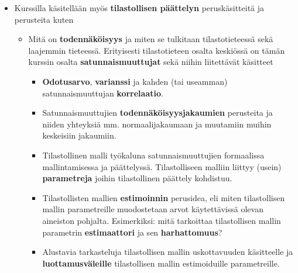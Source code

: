 \documentclass[
]{book}
\providecommand{\tightlist}{%
  \setlength{\itemsep}{0pt}\setlength{\parskip}{0pt}}
\begin{document}
\vspace{0.75cm}

\begin{itemize}
\tightlist
\item
  Kurssilla käsitellään myös \textbf{tilastollisen päättelyn} peruskäsitteitä ja perusteita kuten

  \begin{itemize}
  \tightlist
  \item
    Mitä on \textbf{todennäköisyys} ja miten se tulkitaan tilastotieteessä sekä laajemmin tieteessä. Erityisesti tilastotieteen osalta keskiössä on tämän kurssin osalta \textbf{satunnaismuuttujat} sekä niihin liitettävät käsitteet

    \begin{itemize}
    \tightlist
    \item
      \textbf{Odotusarvo}, \textbf{varianssi} ja kahden (tai useamman) satunnaismuuttujan \textbf{korrelaatio}.
    \item
      Satunnaismuuttujien \textbf{todennäköisyysjakaumien} perusteita ja niiden yhteyksiä mm. normaalijakaumaan ja muutamiin muihin keskeisiin jakaumiin.
    \item
      Tilastollinen malli työkaluna satunnaismuuttujien formaalissa mallintamisessa ja päättelyssä. Tilastolliseen malliin liittyy (usein) \textbf{parametreja} joihin tilastollinen päättely kohdistuu.
    \item
      Tilastollisten mallien \textbf{estimoinnin} perusidea, eli miten tilastollisen mallin parametreille muodostetaan arvot käytettävissä olevan aineiston pohjalta. Esimerkiksi: mitä tarkoittaa tilastollisen mallin parametrin \textbf{estimaattori} ja sen \textbf{harhattomuus}?
    \item
      Alustavia tarkasteluja tilastollisen mallin uskottavuuden käsitteelle ja \textbf{luottamusväleille} tilastollisen mallin estimoiduille parametreille.
    \end{itemize}
  \end{itemize}
\end{itemize}

\vspace{0.75cm}
\end{document}
